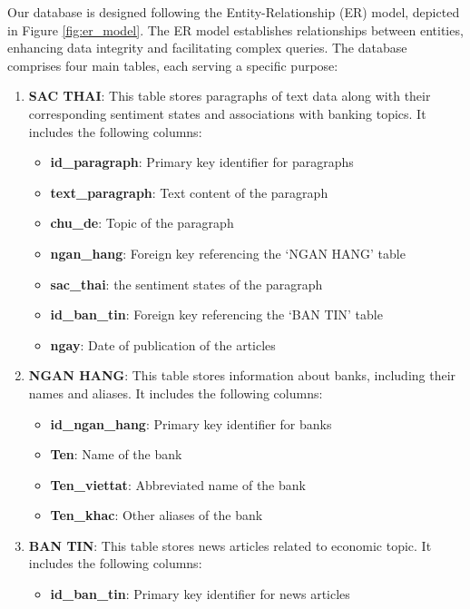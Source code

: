{Our database is designed following the Entity-Relationship (ER) model\cite{STOREY199147}, depicted in Figure \ref{fig:er_model}. The ER model establishes relationships between entities, enhancing data integrity and facilitating complex queries. The database comprises four main tables, each serving a specific purpose:
\begin{enumerate}
    \item \textbf{SAC THAI}: This table stores paragraphs of text data along with their corresponding sentiment states and associations with banking topics. It includes the following columns:
        \begin{itemize}
            \item \textbf{id\_paragraph}: Primary key identifier for paragraphs
            \item \textbf{text\_paragraph}: Text content of the paragraph
            \item \textbf{chu\_de}: Topic of the paragraph
            \item \textbf{ngan\_hang}: Foreign key referencing the `NGAN HANG' table
            \item \textbf{sac\_thai}: the sentiment states of the paragraph
            \item \textbf{id\_ban\_tin}: Foreign key referencing the `BAN TIN' table
            \item \textbf{ngay}: Date of publication of the articles
        \end{itemize}
    \item \textbf{NGAN HANG}: This table stores information about banks, including their names and aliases. It includes the following columns:
        \begin{itemize}
            \item \textbf{id\_ngan\_hang}: Primary key identifier for banks
            \item \textbf{Ten}: Name of the bank
            \item \textbf{Ten\_viettat}: Abbreviated name of the bank
            \item \textbf{Ten\_khac}: Other aliases of the bank
        \end{itemize}
    \item \textbf{BAN TIN}: This table stores news articles related to economic topic. It includes the following columns: 
        \begin{itemize}
            \item \textbf{id\_ban\_tin}: Primary key identifier for news articles

\end{itemize}
\end{enumerate}}
